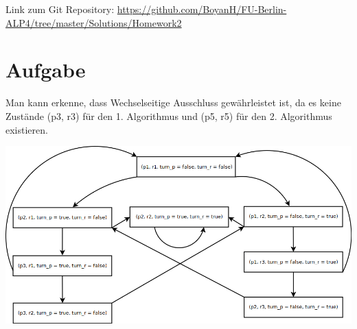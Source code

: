\usepackage{graphicx}

\newcommand{\dozent}{Prof. Dr. Margarita Esponda}					%
\newcommand{\tutor}{Lilli Walter}						%
\newcommand{\tutoriumNo}{Tutorium 6}				%
\newcommand{\projectNo}{2}									%
\newcommand{\veranstaltung}{Nichtsequentielle Programmierung}	%
\newcommand{\semester}{SoeSe 2017}						%
\newcommand{\studenten}{Boyan Hristov}			%





Link zum Git Repository: \url{https://github.com/BoyanH/FU-Berlin-ALP4/tree/master/Solutions/Homework2}

\section{Aufgabe}
Man kann erkenne, dass Wechselseitige Ausschluss gewährleistet ist, da es keine Zustände (p3, r3) für den 1. Algorithmus und (p5, r5) für den 2. Algorithmus existieren.

\includegraphics[width=\textwidth]{./exercise1/diagramm-1-A.png}

